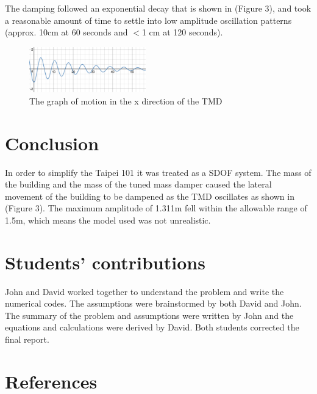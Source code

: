\documentclass[12pt,twoside,letterpaper]{article}
\begin{document}
The damping followed an exponential decay that is shown in (Figure 3), and took a reasonable amount of time to settle into low amplitude oscillation patterns (approx. 10cm at 60 seconds and $<$1 cm at 120 seconds).

\begin{figure}[h!]
\centering
\includegraphics[width=0.45\textwidth]{figures/graph.png} 
\caption{The graph of motion in the x direction of the TMD}
\end{figure}

\section*{Conclusion}
In order to simplify the Taipei 101 it was treated as a SDOF system. The mass of the building and the mass of the tuned mass damper caused the  lateral movement of the building to be dampened as the TMD oscillates as shown in (Figure 3). The maximum amplitude of 1.311m fell within the allowable range of 1.5m, which means the model used was not unrealistic.


\newpage
\section*{Students' contributions}
John and David worked together to understand the problem and write the numerical codes. The assumptions were brainstormed by both David and John. The summary of the problem and assumptions were written by John and the equations and calculations were derived by David. Both students corrected the final report.

\section*{References}
\end{document}
